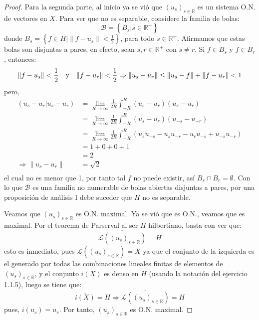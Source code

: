 \documentclass[12pt]{report}
\newcounter{it}
\theoremstyle{largebreak}
\newcommand\pint[2]{\ensuremath{\left(#1\big|#2\right)}}
\newcommand\conj[1]{\ensuremath{\overline{#1}}}
\newcommand\norm[1]{\ensuremath{\|#1\|}}
\begin{document}
\begin{proof}
        Para la segunda parte, al inicio ya se vió que $\left(u_s \right)_{s\in\mathbb{R}}$ es un sistema O.N. de vectores en $X$. Para ver que no es separable, considere la familia de bolas:
        \begin{equation*}
            \mathcal{B}=\left\{B_s\Big|s\in\mathbb{R}^+ \right\}
        \end{equation*}
        donde $B_s=\left\{f\in H\Big|\norm{f-u_s}<\frac{1}{2} \right\}$, para todo $s\in\mathbb{R}^+$. Afirmamos que estas bolas son disjuntas a pares, en efecto, sean $s,r\in\mathbb{R}^+$ con $s\neq r$. Si $f\in B_s$ y $f\in B_r$, entonces:
        \begin{equation*}
            \norm{f-u_s}<\frac{1}{2} \quad\textup{y}\quad\norm{f-u_r}<\frac{1}{2}
            \Rightarrow  \norm{u_s-u_r}\leq\norm{u_s-f}+\norm{f-u_r}<1
        \end{equation*}
        pero,
        \begin{equation*}
            \begin{split}
                \pint{u_s-u_r}{u_s-u_r}&=\lim_{R\rightarrow\infty }\frac{1}{2R}\int_{-R}^{R}(u_s-u_r)\conj{(u_s-u_r)}\\
                &=\lim_{R\rightarrow\infty }\frac{1}{2R}\int_{-R}^{R}(u_s-u_r)(u_{-s}-u_{-r})\\
                &=\lim_{R\rightarrow\infty }\frac{1}{2R}\int_{-R}^{R}\left(u_s u_{-s} - u_s u_{-r} - u_r u_{-s} + u_{-s}u_{-r}\right) \\
                &=1+0+0+1\\
                &=2\\
                \Rightarrow \norm{u_s-u_r}&=\sqrt{2}\\
            \end{split}
        \end{equation*}
        el cual no es menor que 1, por tanto tal $f$ no puede existir, así $B_s\cap B_r=\emptyset$. Con lo que $\mathcal{B}$ es una familia no numerable de bolas abiertas disjuntas a pares, por una proposición de análisis I debe suceder que $H$ no es separable.

        Veamos que $\left(u_s \right)_{s\in\mathbb{R}}$ es O.N. maximal. Ya se vió que es O.N., veamos que es maximal. Por el teorema de Parserval al ser $H$ hilbertiano, basta con ver que:
        \begin{equation*}
            \overline{\mathcal{L}\left(\left(u_s \right)_{s\in\mathbb{R}}\right)}=H
        \end{equation*}
        esto es inmediato, pues $\mathcal{L}\left(\left(u_s \right)_{s\in\mathbb{R}}\right)=X$ ya que el conjunto de la izquierda es el generado por todas las combinaciones lineales finitas de elementos de $\left(u_s \right)_{s\in\mathbb{R}}$, y el conjunto $i(X)$ es denso en $H$ (usando la notación del ejercicio 1.1.5), luego se tiene que:
        \begin{equation*}
            \overline{i(X)}=H\Rightarrow\overline{\mathcal{L}\left(\left(u_s \right)_{s\in\mathbb{R}}\right)}=H
        \end{equation*}
        pues, $i(u_s)=u_s$. Por tanto, $\left(u_s \right)_{s\in\mathbb{R}}$ es O.N. maximal.
    \end{proof}
\end{document}
